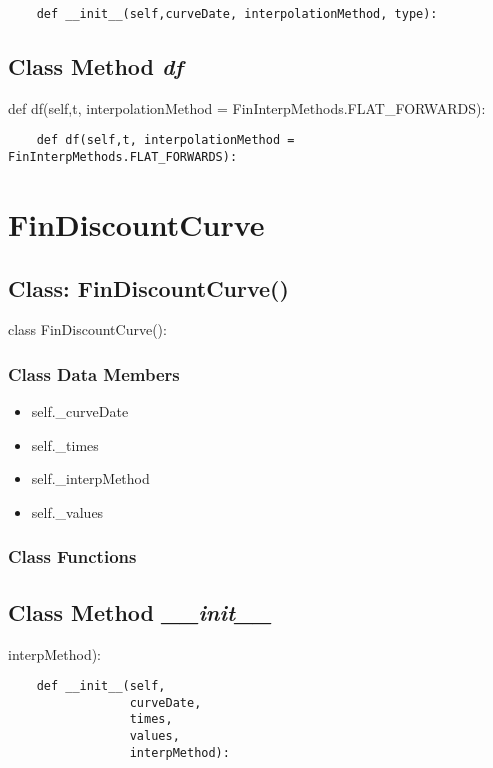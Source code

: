 \documentclass[twoside,11pt]{book}
\begin{document}
\begin{lstlisting}
    def __init__(self,curveDate, interpolationMethod, type):
\end{lstlisting}

\subsection{Class Method {\it df}}
def df(self,t, interpolationMethod = FinInterpMethods.FLAT\_FORWARDS):

\begin{lstlisting}
    def df(self,t, interpolationMethod = FinInterpMethods.FLAT_FORWARDS):
\end{lstlisting}

\newpage
\section{FinDiscountCurve}

\subsection{Class: FinDiscountCurve()}
class FinDiscountCurve():

\subsubsection{Class Data Members}
\begin{itemize}
\item{self.\_curveDate}
\item{self.\_times}
\item{self.\_interpMethod}
\item{self.\_values}
\end{itemize}

\subsubsection{Class Functions}

\subsection{Class Method {\it \_\_init\_\_}}
interpMethod):

\begin{lstlisting}
    def __init__(self, 
                 curveDate, 
                 times, 
                 values, 
                 interpMethod):
\end{lstlisting}
\end{document}

